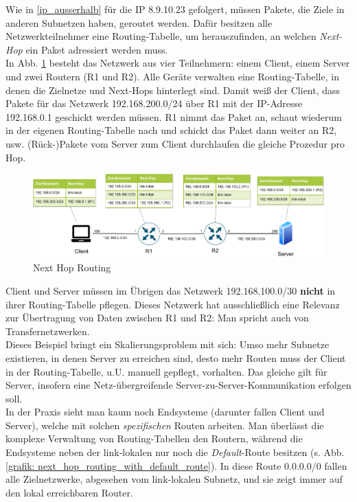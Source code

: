 Wie in \ref{ip_ausserhalb} für die IP 8.9.10.23 gefolgert, müssen Pakete, die Ziele in anderen Subnetzen haben, geroutet werden. Dafür besitzen alle Netzwerkteilnehmer eine Routing-Tabelle, um herauszufinden, an welchen \textit{Next-Hop} ein Paket adressiert werden muss.\\
In Abb. \ref{grafik: next_hop_routing} besteht das Netzwerk aus vier Teilnehmern: einem \gls{Client}, einem Server und zwei Routern (R1 und R2). Alle Geräte verwalten eine Routing-Tabelle, in denen die Zielnetze und Next-Hops hinterlegt sind.
Damit weiß der \gls{Client}, dass Pakete für das Netzwerk 192.168.200.0/24 über R1 mit der IP-Adresse 192.168.0.1 geschickt werden müssen. R1 nimmt das Paket an, schaut wiederum in der eigenen Routing-Tabelle nach und schickt das Paket dann weiter an R2, usw. (Rück-)Pakete vom Server zum \gls{Client} durchlaufen die gleiche Prozedur pro Hop.\\
\begin{figure}[h]
  \centering
  \includegraphics[scale=0.9]{Figures/next_hop_routing_specific_table.pdf}
  \caption{Next Hop Routing}
  \label{grafik: next_hop_routing}
\end{figure}\FloatBarrier
\gls{Client} und Server müssen im Übrigen das Netzwerk 192.168.100.0/30 \textbf{nicht} in ihrer Routing-Tabelle pflegen. Dieses Netzwerk hat ausschließlich eine Relevanz zur Übertragung von Daten zwischen R1 und R2: Man spricht auch von Transfernetzwerken.\\
Dieses Beispiel bringt ein Skalierungsproblem mit sich: Umso mehr Subnetze existieren, in denen Server zu erreichen sind, desto mehr Routen muss der \gls{Client} in der Routing-Tabelle, u.U. manuell gepflegt, vorhalten. Das gleiche gilt für Server, insofern eine Netz-übergreifende Server-zu-Server-Kommunikation erfolgen soll.\\
In der Praxis sieht man kaum noch Endsysteme (darunter fallen \gls{Client} und Server), welche mit solchen \textit{spezifischen} Routen arbeiten. Man überlässt die komplexe Verwaltung von Routing-Tabellen den Routern, während die Endsysteme neben der link-lokalen nur noch die \textit{Default}-Route besitzen (s. Abb. \ref{grafik: next_hop_routing_with_default_route}). In diese Route 0.0.0.0/0 fallen alle Zielnetzwerke, abgesehen vom link-lokalen Subnetz, und sie zeigt immer auf den lokal erreichbaren Router.\\
